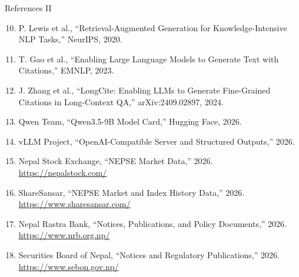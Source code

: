 \documentclass[aspectratio=169,11pt]{beamer}
\begin{document}
\begin{frame}{References II}
  \tiny
  \begin{enumerate}
    \setcounter{enumi}{9}
    \item P. Lewis et al., ``Retrieval-Augmented Generation for Knowledge-Intensive NLP Tasks,'' NeurIPS, 2020.
    \item T. Gao et al., ``Enabling Large Language Models to Generate Text with Citations,'' EMNLP, 2023.
    \item J. Zhang et al., ``LongCite: Enabling LLMs to Generate Fine-Grained Citations in Long-Context QA,'' arXiv:2409.02897, 2024.
    \item Qwen Team, ``Qwen3.5-9B Model Card,'' Hugging Face, 2026.
    \item vLLM Project, ``OpenAI-Compatible Server and Structured Outputs,'' 2026.
    \item Nepal Stock Exchange, ``NEPSE Market Data,'' 2026. \url{https://nepalstock.com/}
    \item ShareSansar, ``NEPSE Market and Index History Data,'' 2026. \url{https://www.sharesansar.com/}
    \item Nepal Rastra Bank, ``Notices, Publications, and Policy Documents,'' 2026. \url{https://www.nrb.org.np/}
    \item Securities Board of Nepal, ``Notices and Regulatory Publications,'' 2026. \url{https://www.sebon.gov.np/}
  \end{enumerate}
\end{frame}
\end{document}
